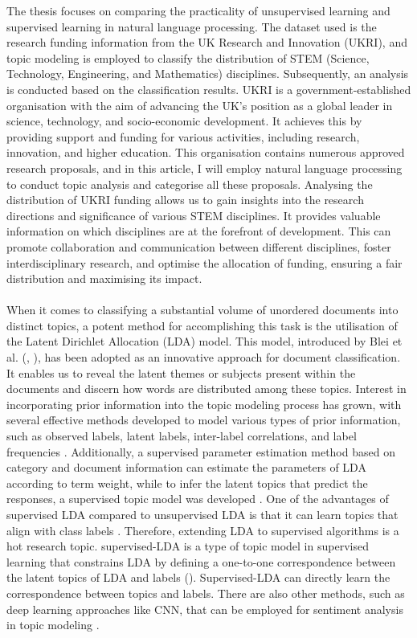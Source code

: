 \documentclass[12pt,twoside]{article}
\begin{document}
The thesis focuses on comparing the practicality of unsupervised learning and supervised learning in natural language processing. The dataset used is the research funding information from the UK Research and Innovation (UKRI), and topic modeling is employed to classify the distribution of STEM (Science, Technology, Engineering, and Mathematics) disciplines. Subsequently, an analysis is conducted based on the classification results. UKRI is a government-established organisation with the aim of advancing the UK's position as a global leader in science, technology, and socio-economic development. It achieves this by providing support and funding for various activities, including research, innovation, and higher education. This organisation contains numerous approved research proposals, and in this article, I will employ natural language processing to conduct topic analysis and categorise all these proposals. Analysing the distribution of UKRI funding allows us to gain insights into the research directions and significance of various STEM disciplines. It provides valuable information on which disciplines are at the forefront of development. This can promote collaboration and communication between different disciplines, foster interdisciplinary research, and optimise the allocation of funding, ensuring a fair distribution and maximising its impact.\\\\

When it comes to classifying a substantial volume of unordered documents into distinct topics, a potent method for accomplishing this task is the utilisation of the Latent Dirichlet Allocation (LDA) model. This model, introduced by Blei et al. (\cite{blei2003latent}, \cite{blei2012probabilistic}), has been adopted as an innovative approach for document classification. It enables us to reveal the latent themes or subjects present within the documents and discern how words are distributed among these topics. Interest in incorporating prior information into the topic modeling process has grown, with several effective methods developed to model various types of prior information, such as observed labels, latent labels, inter-label correlations, and label frequencies \cite{Wang:2020aa}. Additionally, a supervised parameter estimation method based on category and document information can estimate the parameters of LDA according to term weight, while to infer the latent topics that predict the responses, a supervised topic model was developed \cite{Liu2015}. One of the advantages of supervised LDA compared to unsupervised LDA is that it can learn topics that align with class labels \cite{Lakshminarayanan2011}. Therefore, extending LDA to supervised algorithms is a hot research topic. supervised-LDA is a type of topic model in supervised learning that constrains LDA by defining a one-to-one correspondence between the latent topics of LDA and labels (\cite{ramage2009labeled}). Supervised-LDA can directly learn the correspondence between topics and labels. There are also other methods, such as deep learning approaches like CNN, that can be employed for sentiment analysis in topic modeling \cite{Mohammed:2019aa} \cite{Ombabi:2020aa}.\\\\
\end{document}
